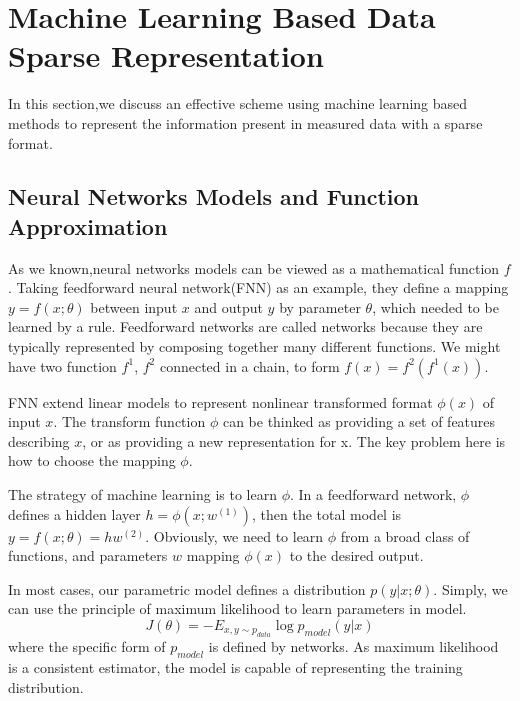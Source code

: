 \section{Machine Learning Based Data Sparse Representation}

In this section,we discuss an effective scheme using machine learning based methods to represent the information present in measured data with a sparse format.

\subsection{Neural Networks Models and Function Approximation}
As we known,neural networks models can be viewed as a mathematical function $f$. Taking feedforward neural network(FNN) as an example, they define a mapping ${{y}}=f(x;\theta )$ between input $x$ and output $y$ by parameter $\theta$, which needed to be learned by a rule. Feedforward networks are called networks because they are typically represented by composing together many different functions. We might have two function $f^{1}$, $f^{2}$ connected in a chain\cite{goodfellow2016deep}, to form
$f(x) = f^{2}(f^{1}(x))$.

FNN extend linear models to represent nonlinear transformed format $\phi(x)$ of input $x$. The transform function $\phi$ can be thinked as providing a set of features describing $x$, or as providing a new representation for x. The key problem here is how to choose the mapping $\phi$.

The strategy of machine learning is to learn $\phi$. In a feedforward network, $\phi$ defines a hidden layer $h=\phi(x;w^{(1)})$, then the total model is $y=f(x;\theta)=hw^{(2)}$.
Obviously, we need to learn $\phi$ from a broad class of functions, and parameters $w$ mapping $\phi(x)$ to the desired output.

In most cases, our parametric model defines a distribution $p(y|x;\theta)$. Simply, we can use the principle of maximum likelihood to learn parameters in model.
\begin{equation}
J(\theta ) =  - {E_{x,y \sim {p_{data}}}}\log {p_{model}}(y|x)
\end{equation}
where the specific form of $p_{model}$ is defined by networks.
As maximum likelihood is a consistent estimator, the model is capable of representing the training distribution.

